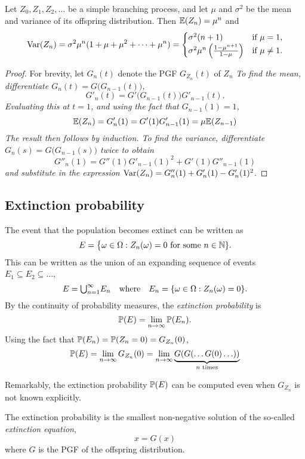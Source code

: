 \begin{theorem}
Let $Z_0,Z_1,Z_2,\ldots$ be a simple branching process, and let $\mu$ and $\sigma^2$ be the mean and variance of its offspring distribution. Then $\mathbb{E}(Z_n)=\mu^n$ and 
\[
\text{Var}(Z_n) 
	= \sigma^2\mu^n(1+\mu+\mu^2+\cdots+\mu^n)
	= \begin{cases}
		\sigma^2(n+1)							& \text{if } \mu=1,\\
		\sigma^2\mu^n\left(\frac{1-\mu^{n+1}}{1-\mu}\right)	& \text{if } \mu\neq 1.
	\end{cases}		
\]
\end{theorem}
\begin{proof}
For brevity, let $G_n(t)$ denote the PGF $G_{Z_n}(t)$ of $Z_n$
\ben
\it %
To find the mean, differentiate $G_n(t) = G\big(G_{n-1}(t)\big)$,
\[
G'_n(t) = G'\big(G_{n-1}(t)\big)G'_{n-1}(t).
\]
Evaluating this at $t=1$, and using the fact that $G_{n-1}(1)=1$,
\[
\mathbb{E}(Z_n) = G'_n(1) = G'(1)G'_{n-1}(1) = \mu\mathbb{E}(Z_{n-1})
\]
The result then follows by induction.
\it %
To find the variance, differentiate $G_n(s)=G\big(G_{n-1}(s)\big)$ twice to obtain
\[
G''_n(1) = G''(1)G'_{n-1}(1)^2 + G'(1)G''_{n-1}(1)
\]
and substitute in the expression $\text{Var}(Z_n) = G''_n(1) + G'_n(1) - G'_n(1)^2$.
\een
\end{proof}

\subsection{Extinction probability}

The event that the population becomes extinct can be written as
\[
E = \big\{\omega\in\Omega:Z_n(\omega)=0 \text{ for some } n\in\mathbb{N}\}.
\]
This can be written as the union of an expanding sequence of events $E_1\subseteq E_2\subseteq\ldots$,
\[
E = {\textstyle\bigcup}_{n=1}^{\infty} E_n \quad\text{where}\quad E_n = \{\omega\in\Omega:Z_n(\omega)=0\}.
\]
By the continuity of probability measures, the \emph{extinction probability} is 
\[
\mathbb{P}(E) = \lim_{n\to\infty}\mathbb{P}(E_n).
\]
Using the fact that $\mathbb{P}(E_n) = \mathbb{P}(Z_n=0) = G_{Z_n}(0)$,
\[
\mathbb{P}(E) = \lim_{n\to\infty}G_{Z_n}(0) = \lim_{n\to\infty} \underbrace{G(G(\ldots G(0)\ldots))}_{\text{$n$ times}}
\]

Remarkably, the extinction probability $\mathbb{P}(E)$ can be computed even when $G_{Z_n}$ is not known explicitly.
\begin{theorem}
The extinction probability is the smallest non-negative solution of the so-called \emph{extinction equation},
\[
x = G(x)
\]
where $G$ is the PGF of the offspring distribution.
\end{theorem}

